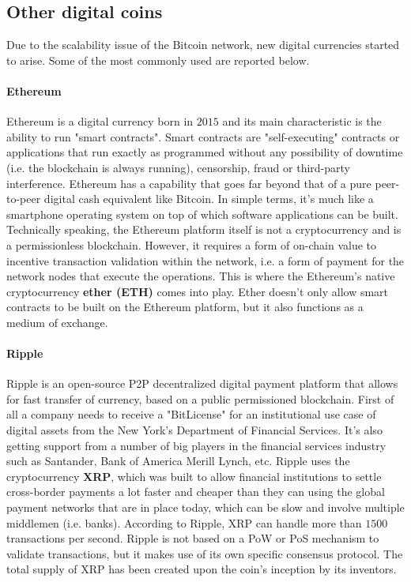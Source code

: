 \subsection{Other digital coins}
Due to the scalability issue of the Bitcoin network, new digital currencies started to arise. Some of the most commonly used are reported below.

\paragraph{Ethereum} Ethereum is a digital currency born in $2015$ and its main characteristic is the ability to run "smart contracts". Smart contracts are "self-executing" contracts or applications that run exactly as programmed without any possibility of downtime (i.e. the blockchain is always running), censorship, fraud or third-party interference. Ethereum has a capability that goes far beyond that of a pure peer-to-peer digital cash equivalent like Bitcoin. In simple terms, it's much like a smartphone operating system on top of which software applications can be built. Technically speaking, the Ethereum platform itself is not a cryptocurrency and is a permissionless blockchain. However, it requires a form of on-chain value to incentive transaction validation within the network, i.e. a form of payment for the network nodes that execute the operations. This is where the Ethereum's native cryptocurrency \textbf{ether (ETH)} comes into play. Ether doesn't only allow smart contracts to be built on the Ethereum platform, but it also functions as a medium of exchange.


\paragraph{Ripple} Ripple is an open-source P2P decentralized digital payment platform that allows for fast transfer of currency, based on a public permissioned blockchain. First of all a company needs to receive a "BitLicense" for an institutional use case of digital assets from the New York's Department of Financial Services. It's also getting support from a number of big players in the financial services industry such as Santander, Bank of America Merill Lynch, etc. Ripple uses the cryptocurrency \textbf{XRP}, which was built to allow financial institutions to settle cross-border payments a lot faster and cheaper than they can using the global payment networks that are in place today, which can be slow and involve multiple middlemen (i.e. banks). According to Ripple, XRP can handle more than $1500$ transactions per second. Ripple is not based on a PoW or PoS mechanism to validate transactions, but it makes use of its own specific consensus protocol. The total supply of XRP has been created upon the coin's inception by its inventors.

